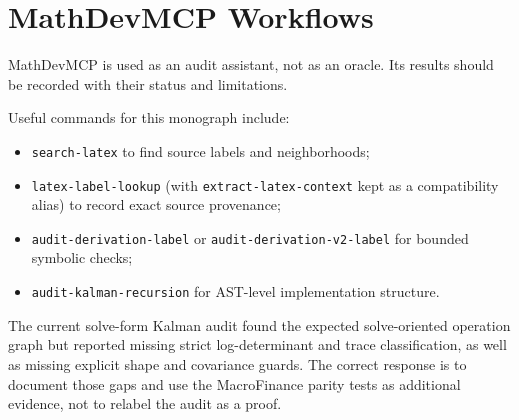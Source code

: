 \chapter{MathDevMCP Workflows}
\label{app:bf-mathdevmcp-workflows}

MathDevMCP is used as an audit assistant, not as an oracle.  Its results should
be recorded with their status and limitations.

Useful commands for this monograph include:
\begin{itemize}
  \item \texttt{search-latex} to find source labels and neighborhoods;
  \item \texttt{latex-label-lookup} (with \texttt{extract-latex-context} kept as a
    compatibility alias) to record exact source provenance;
  \item \texttt{audit-derivation-label} or \texttt{audit-derivation-v2-label} for
    bounded symbolic checks;
  \item \texttt{audit-kalman-recursion} for AST-level implementation structure.
\end{itemize}

The current solve-form Kalman audit found the expected solve-oriented operation
graph but reported missing strict log-determinant and trace classification, as
well as missing explicit shape and covariance guards.  The correct response is
to document those gaps and use the MacroFinance parity tests as additional
evidence, not to relabel the audit as a proof.
